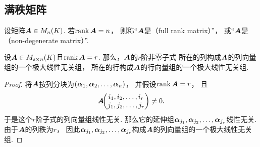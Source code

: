 \subsection{满秩矩阵}
\begin{definition}
设矩阵\(\boldsymbol{A} \in M_n(K)\).
若\(\rank\boldsymbol{A} = n\)，
则称“\(\boldsymbol{A}\)是（full rank matrix）”，
或“\(\boldsymbol{A}\)是（non-degenerate matrix）”.
\end{definition}



\begin{corollary}
设\(\boldsymbol{A}\in M_{s \times n}(K)\)且\(\rank\boldsymbol{A}=r\).
那么，\(\boldsymbol{A}\)的\(r\)阶非零子式
所在的列构成\(\boldsymbol{A}\)的列向量组的一个极大线性无关组，
所在的行构成\(\boldsymbol{A}\)的行向量组的一个极大线性无关组.
\begin{proof}
将\(\boldsymbol{A}\)按列分块为\((\boldsymbol\alpha_1,\boldsymbol\alpha_2,\dotsc,\boldsymbol\alpha_n)\)，
并假设\(\rank\boldsymbol{A} = r\)，
且\begin{equation*}
	\boldsymbol{A}\kern-3.8pt\begin{pmatrix}
		i_1,i_2,\dotsc,i_r \\
		j_1,j_2,\dotsc,j_r
	\end{pmatrix} \neq 0.
\end{equation*}
于是这个\(r\)阶子式的列向量组线性无关.
那么它的延伸组\(\boldsymbol\alpha_{j_1},\boldsymbol\alpha_{j_2},\dotsc,\boldsymbol\alpha_{j_r}\)线性无关.
由于\(\boldsymbol{A}\)的列秩为\(r\)，
因此\(\boldsymbol\alpha_{j_1},\boldsymbol\alpha_{j_2},\dotsc,\boldsymbol\alpha_{j_r}\)构成\(\boldsymbol{A}\)的列向量组的一个极大线性无关组.
\end{proof}
\end{corollary}
